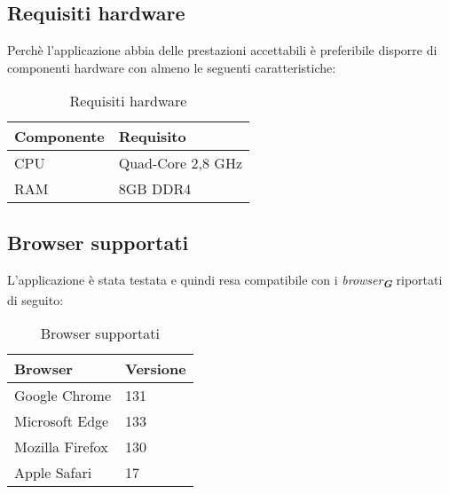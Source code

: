 \subsection{Requisiti hardware}

Perchè l'applicazione abbia delle prestazioni accettabili è preferibile disporre di componenti hardware con almeno le seguenti caratteristiche:

\begin{table}[h!]
    \centering
    \renewcommand{\arraystretch}{1.6} %
    \begin{tabularx}{0.5\textwidth}{|p{4cm}|X|} \hline
    \rowcolor[HTML]{FFD700} 
    \textbf{Componente} & \textbf{Requisito} \\ 
    \hline
    CPU & Quad-Core 2,8 GHz \\ 
    \hline
    RAM & 8GB DDR4 \\ 
    \hline
    \end{tabularx}
    \caption{Requisiti hardware}
\end{table}


\subsection{Browser supportati}

L’applicazione è stata testata e quindi resa compatibile con i \emph{browser}\textsubscript{\textbf{\textit{G}}} riportati di seguito:

\newpage

\begin{table}[h!]
    \centering
    \renewcommand{\arraystretch}{1.6} %
    \begin{tabularx}{0.5\textwidth}{|p{4cm}|X|} \hline
    \rowcolor[HTML]{FFD700} 
    \textbf{Browser} & \textbf{Versione} \\ 
    \hline
    Google Chrome & 131 \\ 
    \hline
    Microsoft Edge & 133 \\ 
    \hline
    Mozilla Firefox & 130 \\
    \hline
    Apple Safari & 17 \\
    \hline
    \end{tabularx}
    \caption{Browser supportati}
\end{table}
